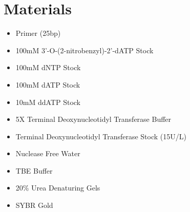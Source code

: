 \documentclass[letterpaper]{article}
\newcommand{\tdt}{Terminal Deoxynucleotidyl Transferase}
\newcommand{\uL}{\micro{}L}
\newcommand{\BdATP}{3'-O-(2-nitrobenzyl)-2'-dATP}
\begin{document}
\section{Materials}
\begin{itemize}
\item{Primer (25bp)}
\item{100mM \BdATP{} Stock}
\item{100mM dNTP Stock}
\item{100mM dATP Stock}
\item{10mM ddATP Stock}
\item{5X \tdt{} Buffer}
\item{\tdt{} Stock (15U/\uL{})}
\item{Nuclease Free Water}
\item{TBE Buffer}
\item{20\% Urea Denaturing Gels}
\item{SYBR Gold}
\end{itemize}
\end{document}
